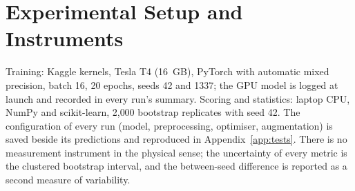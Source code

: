 \section{Experimental Setup and Instruments}
Training: Kaggle kernels, Tesla T4 (16~GB), PyTorch with automatic mixed precision, batch 16, 20 epochs, seeds 42 and 1337; the GPU model is logged at launch and recorded in every run's summary. Scoring and statistics: laptop CPU, NumPy and scikit-learn, 2{,}000 bootstrap replicates with seed 42. The configuration of every run (model, preprocessing, optimiser, augmentation) is saved beside its predictions and reproduced in Appendix~\ref{app:tests}. There is no measurement instrument in the physical sense; the uncertainty of every metric is the clustered bootstrap interval, and the between-seed difference is reported as a second measure of variability.

